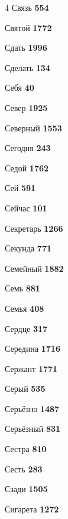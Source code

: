 \begin{multicols}{4}
\noindent Связь \dotfill \textbf{\color{secondary} 554}\par
\noindent Святой \dotfill \textbf{\color{secondary} 1772}\par
\noindent Сдать \dotfill \textbf{\color{secondary} 1996}\par
\noindent Сделать \dotfill \textbf{\color{secondary} 134}\par
\noindent Себя \dotfill \textbf{\color{secondary} 40}\par
\noindent Север \dotfill \textbf{\color{secondary} 1925}\par
\noindent Северный \dotfill \textbf{\color{secondary} 1553}\par
\noindent Сегодня \dotfill \textbf{\color{secondary} 243}\par
\noindent Седой \dotfill \textbf{\color{secondary} 1762}\par
\noindent Сей \dotfill \textbf{\color{secondary} 591}\par
\noindent Сейчас \dotfill \textbf{\color{secondary} 101}\par
\noindent Секретарь \dotfill \textbf{\color{secondary} 1266}\par
\noindent Секунда \dotfill \textbf{\color{secondary} 771}\par
\noindent Семейный \dotfill \textbf{\color{secondary} 1882}\par
\noindent Семь \dotfill \textbf{\color{secondary} 881}\par
\noindent Семья \dotfill \textbf{\color{secondary} 408}\par
\noindent Сердце \dotfill \textbf{\color{secondary} 317}\par
\noindent Середина \dotfill \textbf{\color{secondary} 1716}\par
\noindent Сержант \dotfill \textbf{\color{secondary} 1771}\par
\noindent Серый \dotfill \textbf{\color{secondary} 535}\par
\noindent Серьёзно \dotfill \textbf{\color{secondary} 1487}\par
\noindent Серьёзный \dotfill \textbf{\color{secondary} 831}\par
\noindent Сестра \dotfill \textbf{\color{secondary} 810}\par
\noindent Сесть \dotfill \textbf{\color{secondary} 283}\par
\noindent Сзади \dotfill \textbf{\color{secondary} 1505}\par
\noindent Сигарета \dotfill \textbf{\color{secondary} 1272}\par

\end{multicols}
